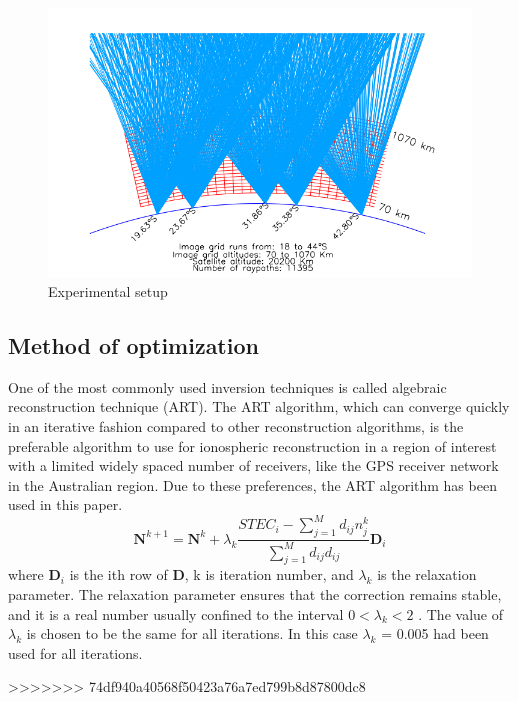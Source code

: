 \documentclass[12pt]{article}
\begin{document}
\begin{figure}[H]
  \centering
  \includegraphics[scale=0.75]{tomo.png}  %
  \caption{Experimental setup}
  \label{fig:1}
\end{figure}
\subsection*{Method of optimization}
One of the most commonly used inversion techniques is called algebraic reconstruction technique (ART). The ART algorithm, which can converge quickly in an iterative fashion compared to other reconstruction algorithms, is the preferable algorithm to use for ionospheric reconstruction in a region of interest with a limited widely spaced number of receivers, like the GPS receiver network in the Australian region. Due to these
preferences, the ART algorithm has been used in this paper.
\begin{equation*}
    \boldsymbol{N}^{k+1} = \boldsymbol{N}^{k} + \lambda_k\frac{STEC_i - \sum_{j=1}^Md_{ij}n_j^k}{\sum_{j=1}^Md_{ij}d_{ij}}\boldsymbol{D}_i
\end{equation*}
where $\boldsymbol{D}_i$ is the ith row of $\boldsymbol{D}$, k is iteration number, and $\lambda_k$ is the relaxation parameter. The relaxation parameter ensures that the correction remains stable, and it is a real number usually confined to the interval $0 < \lambda_k < 2$ . The value of $\lambda_k$ is chosen to be the same for all iterations. In this case $\lambda_k$ = 0.005 had been used for all iterations.

>>>>>>> 74df940a40568f50423a76a7ed799b8d87800dc8
\end{document}
